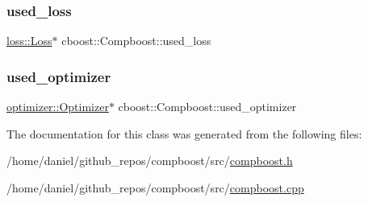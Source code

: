 \subsubsection{\texorpdfstring{used\+\_\+loss}{used\_loss}}
{\footnotesize\ttfamily \hyperlink{classloss_1_1_loss}{loss\+::\+Loss}$\ast$ cboost\+::\+Compboost\+::used\+\_\+loss\hspace{0.3cm}{\ttfamily [private]}}

\mbox{\label{classcboost_1_1_compboost_a6c0311a05cf6128b4c76fabbc432b807}} 
\subsubsection{\texorpdfstring{used\+\_\+optimizer}{used\_optimizer}}
{\footnotesize\ttfamily \hyperlink{classoptimizer_1_1_optimizer}{optimizer\+::\+Optimizer}$\ast$ cboost\+::\+Compboost\+::used\+\_\+optimizer\hspace{0.3cm}{\ttfamily [private]}}



The documentation for this class was generated from the following files\+:\begin{DoxyCompactItemize}
\item 
/home/daniel/github\+\_\+repos/compboost/src/\hyperlink{compboost_8h}{compboost.\+h}\item 
/home/daniel/github\+\_\+repos/compboost/src/\hyperlink{compboost_8cpp}{compboost.\+cpp}\end{DoxyCompactItemize}
